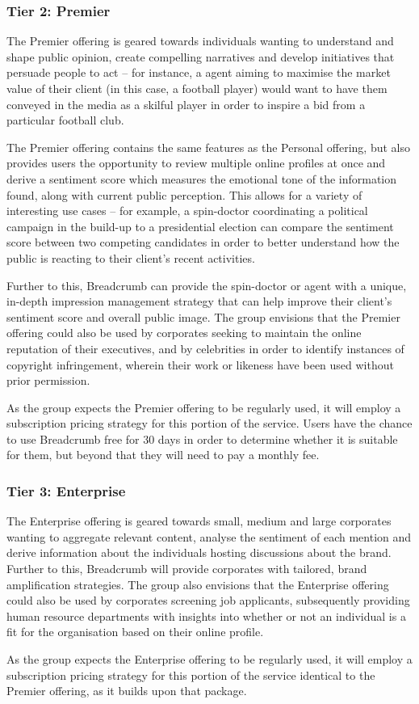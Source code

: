 \subsubsection{Tier 2: Premier}

The Premier offering is geared towards individuals wanting to understand and shape public opinion, create compelling narratives and develop initiatives that persuade people to act -- for instance, a agent aiming to maximise the market value of their client (in this case, a football player) would want to have them conveyed in the media as a skilful player in order to inspire a bid from a particular football club.

The Premier offering contains the same features as the Personal offering, but also provides users the opportunity to review multiple online profiles at once and derive a sentiment score which measures the emotional tone of the information found, along with current public perception. This allows for a variety of interesting use cases -- for example, a spin-doctor coordinating a political campaign in the build-up to a presidential election can compare the sentiment score between two competing candidates in order to better understand how the public is reacting to their client’s recent activities.

Further to this, Breadcrumb can provide the spin-doctor or agent with a unique, in-depth impression management strategy that can help improve their client’s sentiment score and overall public image. The group envisions that the Premier offering could also be used by corporates seeking to maintain the online reputation of their executives, and by celebrities in order to identify instances of copyright infringement, wherein their work or likeness have been used without prior permission. 

As the group expects the Premier offering to be regularly used, it will employ a subscription pricing strategy for this portion of the service. Users have the chance to use Breadcrumb free for 30 days in order to determine whether it is suitable for them, but beyond that they will need to pay a monthly fee.

\subsubsection{Tier 3: Enterprise}

The Enterprise offering is geared towards small, medium and large corporates wanting to aggregate relevant content, analyse the sentiment of each mention and derive information about the individuals hosting discussions about the brand. Further to this, Breadcrumb will provide corporates with tailored, brand amplification strategies. The group also envisions that the Enterprise offering could also be used by corporates screening job applicants, subsequently providing human resource departments with insights into whether or not an individual is a fit for the organisation based on their online profile. 

As the group expects the Enterprise offering to be regularly used, it will employ a subscription pricing strategy for this portion of the service identical to the Premier offering, as it builds upon that package.
